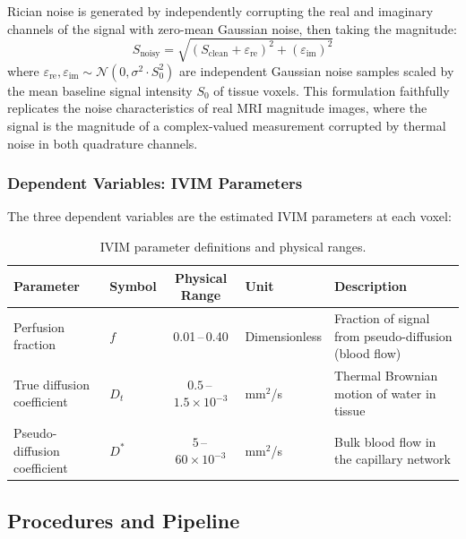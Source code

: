 \documentclass[12pt]{article}
\begin{document}
Rician noise is generated by independently corrupting the real and imaginary channels of the signal with zero-mean Gaussian noise, then taking the magnitude:
\begin{equation}
S_{\text{noisy}} = \sqrt{\left(S_{\text{clean}} + \varepsilon_{\text{re}}\right)^2 + \left(\varepsilon_{\text{im}}\right)^2}
\label{eq:rician}
\end{equation}
where $\varepsilon_{\text{re}}, \varepsilon_{\text{im}} \sim \mathcal{N}(0, \sigma^2 \cdot S_0^2)$ are independent Gaussian noise samples scaled by the mean baseline signal intensity $S_0$ of tissue voxels. This formulation faithfully replicates the noise characteristics of real MRI magnitude images, where the signal is the magnitude of a complex-valued measurement corrupted by thermal noise in both quadrature channels.

\subsubsection{Dependent Variables: IVIM Parameters}

The three dependent variables are the estimated IVIM parameters at each voxel:

\begin{table}[h]
\centering
\caption{IVIM parameter definitions and physical ranges.}
\label{tab:ivim_params}
\begin{tabular}{llcll}
\toprule
\textbf{Parameter} & \textbf{Symbol} & \textbf{Physical Range} & \textbf{Unit} & \textbf{Description} \\
\midrule
Perfusion fraction           & $f$    & 0.01\,--\,0.40           & Dimensionless & Fraction of signal from pseudo-diffusion (blood flow) \\
True diffusion coefficient   & $D_t$  & $0.5$\,--\,$1.5\times10^{-3}$ & mm$^2$/s & Thermal Brownian motion of water in tissue \\
Pseudo-diffusion coefficient & $D^*$  & $5$\,--\,$60\times10^{-3}$    & mm$^2$/s & Bulk blood flow in the capillary network \\
\bottomrule
\end{tabular}
\end{table}

\subsection{Procedures and Pipeline}
\end{document}
